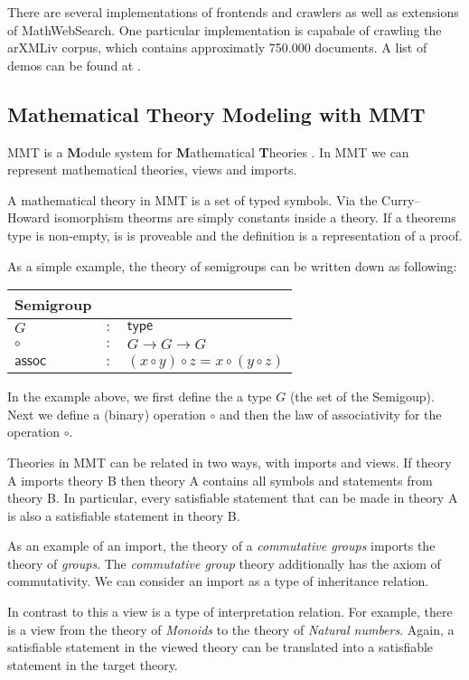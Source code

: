 \documentclass[11pt]{article}
\begin{document}
There are several implementations of frontends and crawlers as well as extensions of MathWebSearch. One particular implementation is capabale of crawling the arXMLiv corpus, which contains approximatly 750.000 documents. A list of demos can be found at \cite{URI:MWSDemo}.

\subsection{Mathematical Theory Modeling with MMT}
\label{sec:mws:mmt}

MMT is a \textbf{M}odule system for \textbf{M}athematical \textbf{T}heories \cite{RabKoh:WSMSML13}. In MMT we can represent mathematical theories, views and imports.

A mathematical theory in MMT is a set of typed symbols. Via the Curry–Howard isomorphism theorms are simply constants inside a theory. If a theorems type is non-empty, is is proveable and the definition is a representation of a proof.

As a simple example, the theory of semigroups can be written down as following:

\begin{tabular}{|l c l|}
  \hline
  \textsf{Semigroup} & &\\\hline
  $G$ & $:$ & $\scriptstyle \mathsf{type}$\\
  $\circ$ & $:$ & $ G \rightarrow G \rightarrow G$\\
  $\scriptstyle \mathsf{assoc}$& $:$ & $(x\circ y)\circ z=x\circ (y\circ z)$\\\hline
\end{tabular}

In the example above, we first define the a type $G$ (the set of the Semigoup). Next we define a (binary) operation $\circ$ and then the law of associativity for the operation $\circ$.

Theories in MMT can be related in two ways, with imports and views. If theory A imports theory B then theory A contains all symbols and statements from theory B. In particular, every satisfiable statement that can be made in theory A is also a satisfiable statement in theory B.

As an example of an import, the theory of a \textit{commutative groups} imports the theory of \textit{groups}. The \textit{commutative group} theory additionally has the axiom of commutativity. We can consider an import as a type of inheritance relation.

In contrast to this a view is a type of interpretation relation. For example, there is a view from the theory of \textit{Monoids} to the theory of \textit{Natural numbers}. Again, a satisfiable statement in the viewed theory can be translated into a satisfiable statement in the target theory.
\end{document}
